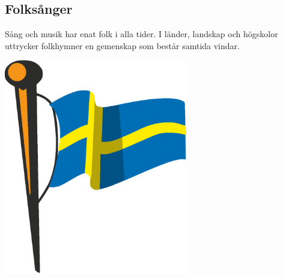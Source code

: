 \begin{flushleft}
\section{Folksånger}
{\Large
Sång och musik har enat folk i alla tider. I länder, landskap och högskolor uttrycker folkhymner en gemenskap som består samtida vindar.
}
\end{flushleft}

\vspace{2cm}
\begin{center}
\includegraphics[width=8cm]{bilder/sverige.eps}
\end{center}

\newpage
{}
\newpage
{}
\newpage
{}
\newpage
{}
\newpage
{}
\newpage
{}
\newpage
{}
\newpage
{}
